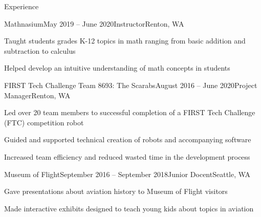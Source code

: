 \documentclass{resume} %
\begin{document}

\begin{rSection}{Experience}

\begin{rSubsection}{Mathnasium}{May 2019 – June 2020}{Instructor}{Renton, WA}
\item Taught students grades K-12 topics in math ranging from basic addition and subtraction to calculus
\item Helped develop an intuitive understanding of math concepts in students
\end{rSubsection}

\begin{rSubsection}{FIRST Tech Challenge Team 8693: The Scarabs}{August 2016 – June 2020}{Project Manager}{Renton, WA}
\item Led over 20 team members to successful completion of a FIRST Tech Challenge (FTC) competition robot
\item Guided and supported technical creation of robots and accompanying software
\item Increased team efficiency and reduced wasted time in the development process
\end{rSubsection}

\begin{rSubsection}{Museum of Flight}{September 2016 – September 2018}{Junior Docent}{Seattle, WA}
\item Gave presentations about aviation history to Museum of Flight visitors
\item Made interactive exhibits designed to teach young kids about topics in aviation
\end{rSubsection}

\end{rSection}

\end{document}
